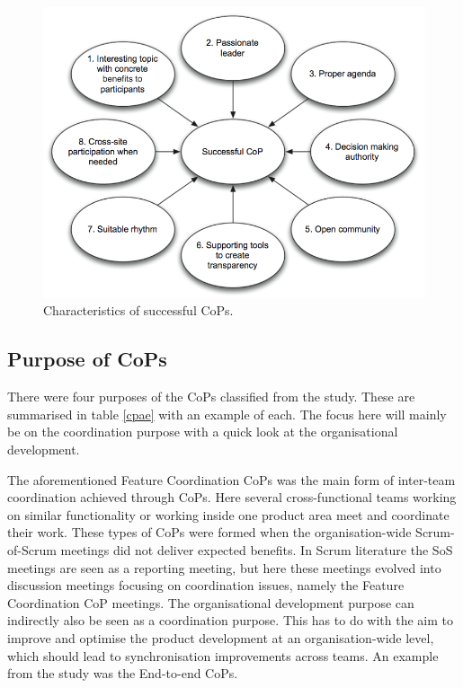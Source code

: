 \begin{figure}[H]
\centering
\includegraphics[width=140mm]{images/CoP.png}
\caption{Characteristics of successful CoPs.}
\label{CoP}
\end{figure}

\subsection{Purpose of CoPs}

There were four purposes of the CoPs classified from the study. These are summarised in table \ref{cpae} with an example of each. The focus here will mainly be on the coordination purpose with a quick look at the organisational development.

The aforementioned Feature Coordination CoPs was the main form of inter-team coordination achieved through CoPs. Here several cross-functional teams working on similar functionality or working inside one product area meet and coordinate their work. These types of CoPs were formed when the organisation-wide Scrum-of-Scrum meetings did not deliver expected benefits. In Scrum literature the SoS meetings are seen as a reporting meeting, but here these meetings evolved into discussion meetings focusing on coordination issues, namely the Feature Coordination CoP meetings. The organisational development purpose can indirectly also be seen as a coordination purpose. This has to do with the aim to improve and optimise the product development at an organisation-wide level, which should lead to synchronisation improvements across teams. An example from the study was the End-to-end CoPs.

